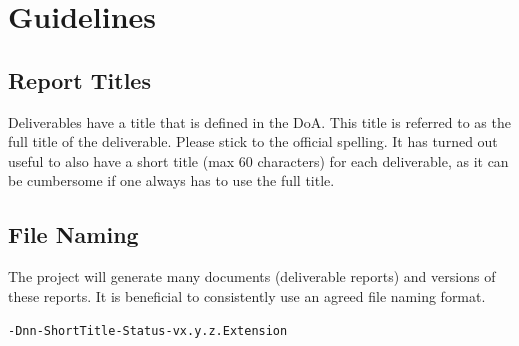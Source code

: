 

\clearpage
\section{Guidelines}
\label{sec:guidelines}


\subsection{Report Titles}
\label{sec:report-titles}

Deliverables have a title that is defined in the \ac{DoA}. 
This title is referred to as the full title of the deliverable. 
Please stick to the official spelling. 
It has turned out useful to also have a short title (max 60 characters) for each deliverable, as it can be cumbersome if one always has to use the full title. 

\subsection{File Naming}
\label{sec:file-naming}

The project will generate many documents (deliverable reports) and versions of these reports. 
It is beneficial to consistently use an agreed file naming format. 

\texttt{\projacronym-Dnn-ShortTitle-Status-vx.y.z.Extension}

